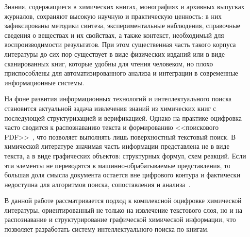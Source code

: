Знания, содержащиеся в химических книгах, монографиях и архивных выпусках журналов, сохраняют высокую научную и практическую ценность: в них зафиксированы методики синтеза, экспериментальные наблюдения, справочные сведения о веществах и их свойствах, а также контекст, необходимый для воспроизводимости результатов. При этом существенная часть такого корпуса литературы до сих пор существует в виде физических изданий или в виде сканированных книг, которые удобны для чтения человеком, но плохо приспособлены для автоматизированного анализа и интеграции в современные информационные системы.

На фоне развития информационных технологий и интеллектуального поиска становится актуальной задача извлечения знаний из химических книг с последующей структуризацией и верификацией. Однако на практике оцифровка часто сводится к распознаванию текста и формированию <<поискового PDF>>~\cite{refDavletov}, что позволяет выполнять лишь поверхностный текстовый поиск. В химической литературе значимая часть информации представлена не в виде текста, а в виде графических объектов: структурных формул, схем реакций. Если эти элементы не переводятся в машинно-обрабатываемые представления, то большая доля смысла документа остается вне цифрового контура и фактически недоступна для алгоритмов поиска, сопоставления и анализа~\cite{refKuchuganov}.

В данной работе рассматривается подход к комплексной оцифровке химической литературы, ориентированный не только на извлечение текстового слоя, но и на распознавание и структурирование графической химической информации, что позволяет разработать систему интеллектуального поиска по книгам.